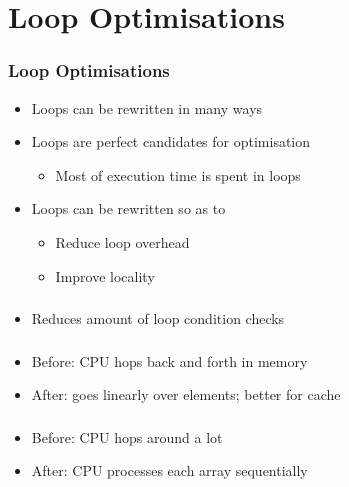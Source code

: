 \section{Loop Optimisations}

\frame{\tableofcontents[currentsection]}

\begin{frame}
  \frametitle{Loop Optimisations}
  \begin{itemize}
    \item Loops can be rewritten in many ways
    \item Loops are perfect candidates for optimisation
          \begin{itemize}
            \item Most of execution time is spent in loops
          \end{itemize}
    \item Loops can be rewritten so as to
          \begin{itemize}
            \item Reduce loop overhead
            \item Improve locality
          \end{itemize}
  \end{itemize}
\end{frame}

\begin{frame}
  \frametitle{}
  \vskip-5mm
  \begin{itemize}
    \item Reduces amount of loop condition checks
  \end{itemize}
\end{frame}

\begin{frame}
  \frametitle{}
  \vskip-5mm
  \begin{itemize}
    \item Before: CPU hops back and forth in memory
    \item After: goes linearly over elements; better for cache
  \end{itemize}
\end{frame}

\begin{frame}
  \frametitle{}
  \vskip-5mm
  \begin{itemize}
    \item Before: CPU hops around a lot
    \item After: CPU processes each array sequentially
  \end{itemize}
\end{frame}

